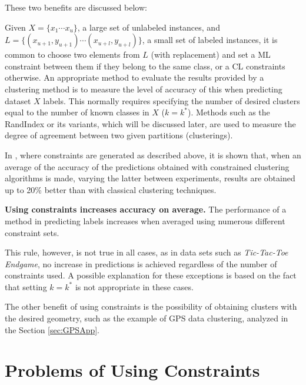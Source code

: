 These two benefits are discussed below:

Given $X = \{x_1 \cdots x_u\}$, a large set of unlabeled instances, and $L = \{(x_{u+1}, y_{u+1}) \cdots (x_{u+l}, y_{u+l})\}$, a small set of labeled instances, it is common to choose two elements from $L$ (with replacement) and set a \acs{ML} constraint between them if they belong to the same class, or a \acs{CL} constraints otherwise. An appropriate method to evaluate the results provided by a clustering method is to measure the level of accuracy of this when predicting dataset $X$ labels. This normally requires specifying the number of desired clusters equal to the number of known classes in $X$ ($k = k^*$). Methods such as the RandIndex \cite{rand1971objective} or its variants, which will be discussed later, are used to measure the degree of agreement between two given partitions (clusterings).

In \cite{wagstaff2000clustering}, where constraints are generated as described above, it is shown that, when an average of the accuracy of the predictions obtained with constrained clustering algorithms is made, varying the latter between experiments, results are obtained up to 20\% better than with classical clustering techniques.

\begin{observation}
	
	\textbf{Using constraints increases accuracy on average.}
	The performance of a method in predicting labels increases when averaged using numerous different constraint sets. \cite{davidson2007survey}
	\label{ob:AccuracyIncrease}
	
\end{observation}

This rule, however, is not true in all cases, as in data sets such as \textit{Tic-Tac-Toe Endgame}, no increase in predictions is achieved regardless of the number of constraints used. A possible explanation for these exceptions is based on the fact that setting $k = k^*$ is not appropriate in these cases.

The other benefit of using constraints is the possibility of obtaining clusters with the desired geometry, such as the example of \acs{GPS} data clustering, analyzed in the Section \ref{sec:GPSApp}.

\section{Problems of Using Constraints} \label{sec:ConstraintsProblems}

